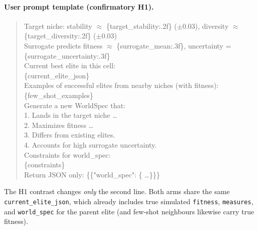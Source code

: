 \paragraph{User prompt template (confirmatory H1).}
\begin{quote}
\small\ttfamily
Target niche: stability $\approx$ \{target\_stability:.2f\} ($\pm$0.03), diversity $\approx$ \{target\_diversity:.2f\} ($\pm$0.03)\\
Surrogate predicts fitness $\approx$ \{surrogate\_mean:.3f\}, uncertainty = \{surrogate\_uncertainty:.3f\}\\[0.4em]
Current best elite in this cell:\\
\{current\_elite\_json\}\\[0.4em]
Examples of successful elites from nearby niches (with fitness):\\
\{few\_shot\_examples\}\\[0.4em]
Generate a new WorldSpec that:\\
1. Lands in the target niche \ldots\\
2. Maximizes fitness \ldots\\
3. Differs from existing elites.\\
4. Accounts for high surrogate uncertainty.\\[0.4em]
Constraints for world\_spec:\\
\{constraints\}\\[0.4em]
Return JSON only: \{\{"world\_spec": \{ \ldots \}\}\}
\end{quote}
The H1 contrast changes \emph{only} the second line. Both arms share the same \texttt{current\_elite\_json}, which already includes true simulated \texttt{fitness}, \texttt{measures}, and \texttt{world\_spec} for the parent elite (and few-shot neighbours likewise carry true fitness).

